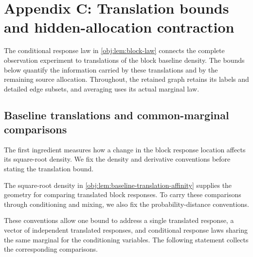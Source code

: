\section{Appendix C: Translation bounds and hidden-allocation contraction}

The conditional response law in \cref{obj:lem:block-law} connects the complete observation experiment to translations of the block baseline density. The bounds below quantify the information carried by these translations and by the remaining source allocation. Throughout, the retained graph retains its labels and detailed edge subsets, and averaging uses its actual marginal law.

\subsection{Baseline translations and common-marginal comparisons}

The first ingredient measures how a change in the block response location affects its square-root density. We fix the density and derivative conventions before stating the translation bound.



The square-root density in \cref{obj:lem:baseline-translation-affinity} supplies the geometry for comparing translated block responses. To carry these comparisons through conditioning and mixing, we also fix the probability-distance conventions.



These conventions allow one bound to address a single translated response, a vector of independent translated responses, and conditional response laws sharing the same marginal for the conditioning variables. The following statement collects the corresponding comparisons.

